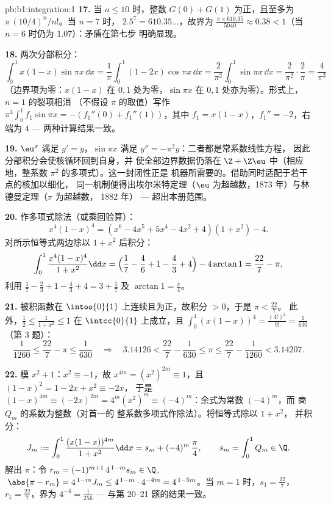 \begin{solution}{pb:b1:integration:1}
\textbf{17.} 当 $a \leq 10$ 时，整数 $G(0) + G(1)$
为正，且至多为 $\pi\,(10/4)^n/n!$。当 $n = 7$ 时，
$2.5^7 = 610.35\dots$，故界为 $\frac{\pi \times
610.35}{5040} \approx 0.38 < 1$（当 $n = 6$ 时仍为
$1.07$）：矛盾在第七步
明确显现。

\textbf{18.} 两次分部积分：
\[
\int_0^1 x(1-x)\sin\pi x\,\dd x
= \frac1\pi\int_0^1 (1 - 2x)\cos\pi x\,\dd x
= \frac{2}{\pi^2}\int_0^1 \sin\pi x\,\dd x
= \frac{2}{\pi^2}\cdot\frac{2}{\pi} = \frac{4}{\pi^3}
\]
（边界项为零：$x(1-x)$ 在 $0, 1$ 处为零，$\sin\pi x$
在 $0, 1$ 处亦为零）。形式上，$n = 1$ 的裂项相消
（不假设 $\pi$ 的取值）写作 $\pi^3\int_0^1 f_1\sin\pi x = -(f_1''(0) +
f_1''(1))$，其中 $f_1 = x(1 - x)$，$f_1'' = -2$，右端为 $4$
--- 两种计算结果一致。

\textbf{19.} $\eu^x$ 满足 $y' = y$，$\sin\pi x$ 满足
$y'' = -\pi^2 y$：二者都是常系数线性方程，
因此分部积分会使核循环回到自身，并
使全部边界数据仍落在 $\Z + \Z\eu$ 中（相应地，整系数
$\pi^2$ 的多项式）。这一封闭性正是
机器所需要的。借助同时适配于若干点的核加以细化，
同一机制便得出埃尔米特定理（$\eu$
为超越数，1873 年）与林德曼定理（$\pi$ 为超越数，
1882 年） --- 超出本册范围。

\textbf{20.} 作多项式除法（或乘回验算）：
\[
x^4(1-x)^4 = (x^6 - 4x^5 + 5x^4 - 4x^2 + 4)(1 + x^2) - 4 .
\]
对所示恒等式两边除以 $1 + x^2$ 后积分：
\[
\int_0^1 \frac{x^4(1-x)^4}{1+x^2}\dd x
= \Bigl(\frac17 - \frac46 + 1 - \frac43 + 4\Bigr)
- 4\arctan 1
= \frac{22}{7} - \pi ,
\]
利用 $\frac17 - \frac23 + 1 - \frac43 + 4 = 3 + \frac17$ 及
$\arctan 1 = \frac\pi4$。

\textbf{21.} 被积函数在
$\intoo{0}{1}$ 上连续且为正，故积分 $> 0$，于是 $\pi < \frac{22}{7}$。
此外，$\frac12 \leq \frac{1}{1+x^2} \leq 1$ 在
$\intcc{0}{1}$ 上成立，且 $\int_0^1 (x(1-x))^4 = \frac{(4!)^2}{9!} =
\frac{1}{630}$（第 3 题）：
\[
\frac{1}{1260} \leq \frac{22}{7} - \pi \leq \frac{1}{630}
\quad\Longrightarrow\quad
3.14126 < \frac{22}{7} - \frac{1}{630} \leq \pi \leq
\frac{22}{7} - \frac{1}{1260} < 3.14207 .
\]

\textbf{22.} 模 $x^2 + 1$：$x^2 \equiv -1$，故 $x^{4m} =
(x^2)^{2m} \equiv 1$，且 $(1 - x)^2 = 1 - 2x + x^2 \equiv -2x$，
于是 $(1-x)^{4m} \equiv (-2x)^{2m} = 4^m (x^2)^m \equiv
(-4)^m$：余式为常数 $(-4)^m$，而
商 $Q_m$ 的系数为整数（对首一的
整系数多项式作除法）。将恒等式除以 $1 + x^2$，
并积分：
\[
J_m := \int_0^1 \frac{(x(1-x))^{4m}}{1+x^2}\dd x
= s_m + (-4)^m\,\frac{\pi}{4},
\qquad s_m = \int_0^1 Q_m \in \Q .
\]
解出 $\pi$：令 $r_m = (-1)^{m+1}\,4^{\,1-m} s_m \in
\Q$, $\;\abs{\pi - r_m} = 4^{\,1-m} J_m \leq
4^{\,1-m}\cdot4^{-4m} = 4^{\,1-5m}$。当 $m = 1$ 时，$s_1 =
\frac{22}{7}$，$r_1 = \frac{22}{7}$，界为 $4^{-4} =
\frac{1}{256}$ --- 与第 20--21 题的结果一致。


\end{solution}
